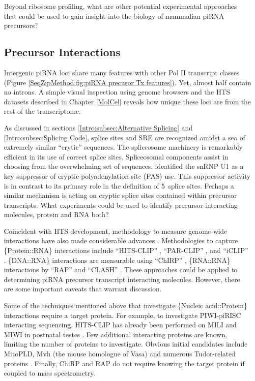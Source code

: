     Beyond ribosome profiling, what are other potential experimental approaches that could be used to gain insight into the biology of mammalian piRNA precursors?

  \subsection{Precursor Interactions}
    \label{Disc:subsec:Labeling of precursors}


    Intergenic piRNA loci share many features with other Pol II transcript classes (Figure \ref{SeqZipMethod:fig:piRNA precusor Tx features}). Yet, almost half contain no introns. A simple visual inspection using genome browsers and the HTS datasets described in Chapter \ref{MolCel} reveals how unique these loci are from the rest of the transcriptome.

    As discussed in sections \ref{Intro:subsec:Alternative Splicing} and \ref{Intro:subsec:Splicing Code}, splice sites and SRE are recognized amidst a sea of extremely similar ``crytic'' sequences. The spliceosome machinery is remarkably efficient in its use of correct splice sites. Spliceosomal components assist in choosing from the overwhelming set of sequences. \citet{Berg2012} identified the snRNP U1 as a key suppressor of cryptic polyadenylation site (PAS) use. This suppressor activity is in contrast to its primary role in the definition of 5\textprime~splice sites. Perhaps a similar mechanism is acting on cryptic splice sites contained within precursor transcripts. What experiments could be used to identify precursor interacting molecules, protein and RNA both?

    Coincident with HTS development, methodology to measure genome-wide interactions have also made considerable advances \citep{Konig2011}. Methodologies to capture \{Protein::RNA\} interactions include ``HITS-CLIP'' \citep{Licatalosi2008}, ``PAR-CLIP'' \citep{Hafner2010}, and ``iCLIP'' \citep{Konig2010}. \{DNA::RNA\} interactions are measurable using ``ChIRP'' \citep{Chu2012}, \{RNA::RNA\} interactions by ``RAP'' and ``CLASH'' \citep{Engreitz2013,Helwak2014}. These approaches could be applied to determining piRNA precursor transcript interacting molecules. However, there are some important caveats that warrant discussion.

    Some of the techniques mentioned above that investigate \{Nucleic acid::Protein\} interactions require a target protein. For example, to investigate PIWI-piRISC interacting sequencing, HITS-CLIP has already been performed on MILI and MIWI in postnatal testes \citep{Vourekas2012}. Few additional interacting proteins are known, limiting the number of proteins to investigate. Obvious initial candidates include MitoPLD, Mvh \citep{Lasko2013} (the mouse homologue of Vasa) and numerous Tudor-related proteins \citep{Chen2011}. Finally, ChiRP and RAP do not require knowing the target protein if coupled to mass spectrometry.

